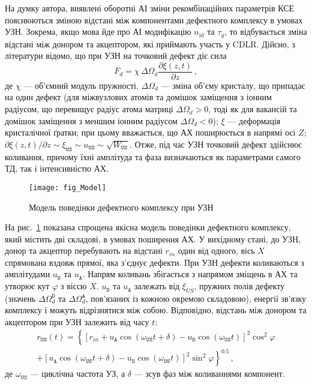 На думку автора, виявлені оборотні АІ зміни рекомбінаційних параметрів КСЕ пояснюються зміною
відстані між компонентами дефектного комплексу в умовах УЗН.
Зокрема, якщо мова йде про АІ модифікацію $n_{\mathrm{id}}$ та $\tau_g$,
то відбувається зміна відстані між донором та акцептором, які приймають участь у CDLR.
Дійсно, з літератури \cite{MirzadeJAP2011,PELESHCHAK:UPJ2016} відомо, що при УЗН на точковий дефект діє сила
\begin{equation}
\label{eqFd}
F_d=\chi\,\Delta\Omega_d\frac{\partial \xi(z,t)}{\partial z}\,,
\end{equation}
де
$\chi$ --- об'ємний модуль пружності,
$\Delta\Omega_d$ --- зміна об'єму кристалу, що припадає на один дефект
(для міжвузлових атомів та домішок заміщення з іонним радіусом, що перевищує радіус атома матриці $\Delta\Omega_d > 0$,
тоді як для вакансій та домішок заміщення з меншим іонним радіусом $\Delta\Omega_d < 0$);
$\xi$ --- деформація кристалічної ґратки;
при цьому вважається, що АХ поширюється в напрямі осі $Z$;
$\partial \xi(z,t)/\partial z\sim \xi_{\mathtt{US}}\sim u_\mathtt{US} \sim \sqrt{W_\mathtt{US}}$.
Отже, під час УЗН точковий дефект здійснює коливання, причому їхні амплітуда та фаза визначаються як параметрами самого ТД, так і інтенсивністю АХ.


\begin{figure}[b]
\center
\texttt{[image: fig\_Model]}
\caption{\label{fig_Model}
Модель поведінки дефектного комплексу при УЗН
}%
\end{figure}

На рис.~\ref{fig_Model} показана спрощена якісна модель поведінки дефектного комплексу, який містить дві складові,
в умовах поширення АХ.
У вихідному стані, до УЗН, донор та акцептор перебувають на відстані $r_{in}$ один від одного,
вісь $X$ спрямована вздовж прямої, яка з'єднує дефекти.
При УЗН дефекти коливаються з амплітудами $u_\mathtt{D}$ та $u_\mathtt{A}$.
Напрям коливань збігається з напрямом зміщень в АХ та утворює кут $\varphi$ з віссю $X$.
$u_\mathtt{D}$ та $u_\mathtt{A}$ залежать від $\xi_{U\!S}$, пружних полів дефекту (значень $\Delta\Omega_d^\mathtt{D}$ та $\Delta\Omega_d^\mathtt{A}$,
пов'язаних із кожною окремою складовою), енергії зв'язку комплексу і можуть відрізнятися між собою.
Відповідно, відстань між донором та акцептором при УЗН залежить від часу $t$:
\begin{multline}
\label{eqrUS}
r_\mathtt{US}(t)=\left\{[r_{in}+u_\mathtt{A}\cos(\omega_\mathtt{US}t+\delta)-u_\mathtt{D}\cos(\omega_\mathtt{US}t)]^2\cos^2\varphi \right.\\
    \left.+ [u_\mathtt{A}\cos(\omega_\mathtt{US}t+\delta)-u_\mathtt{D}\cos(\omega_\mathtt{US}t)]^2\sin^2\varphi\right\}^{0.5}\,,
\end{multline}
де
$\omega_\mathtt{US}$ --- циклічна частота УЗ, а
$\delta$ --- зсув фаз між коливаннями компонент.

